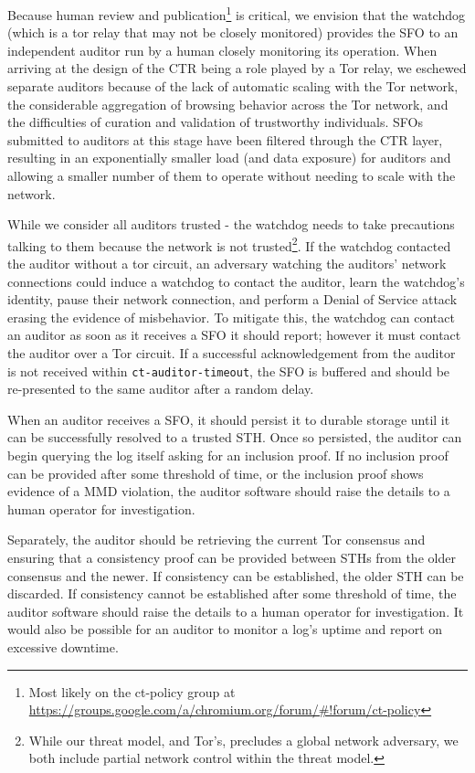 Because human review and publication\footnote{Most likely on the ct-policy group
at \url{https://groups.google.com/a/chromium.org/forum/\#!forum/ct-policy}} is critical, we envision that the watchdog (which is a tor relay that may not be closely monitored) provides the SFO to an independent auditor run by a human closely monitoring its operation. When arriving at the design of the CTR being a role played by a Tor relay, we eschewed separate auditors because of the lack of automatic scaling with the Tor network, the considerable aggregation of browsing behavior across the Tor network, and the difficulties of curation and validation of trustworthy individuals. SFOs submitted to auditors at this stage have been filtered through the CTR layer, resulting in an exponentially smaller load (and data exposure) for auditors and allowing a smaller number of them to operate without needing to scale with the network.

While we consider all auditors trusted - the watchdog needs to take precautions talking to them because the network is not trusted\footnote{While our threat model, and Tor's, precludes a global network adversary, we both include partial network control within the threat model.}. If the watchdog contacted the auditor without a tor circuit, an adversary watching the auditors' network connections could induce a watchdog to contact the auditor, learn the watchdog's identity, pause their network connection, and perform a Denial of Service attack erasing the evidence of misbehavior. To mitigate this, the watchdog can contact an auditor as soon as it receives a SFO it should report; however it must contact the auditor over a Tor circuit. If a successful acknowledgement from the auditor is not received within \texttt{ct-auditor-timeout}, the SFO is buffered and should be re-presented to the same auditor after a random delay.

When an auditor receives a SFO, it should persist it to durable storage until it can be successfully resolved to a trusted STH. Once so persisted, the auditor can begin querying the log itself asking for an inclusion proof. If no inclusion proof can be provided after some threshold of time, or the inclusion proof shows evidence of a MMD violation, the auditor software should raise the details to a human operator for investigation.

Separately, the auditor should be retrieving the current Tor consensus and ensuring that a consistency proof can be provided between STHs from the older consensus and the newer. If consistency can be established, the older STH can be discarded. If consistency cannot be established after some threshold of time, the auditor software should raise the details to a human operator for investigation. It would also be possible for an auditor to monitor a log's uptime and report on excessive downtime.

